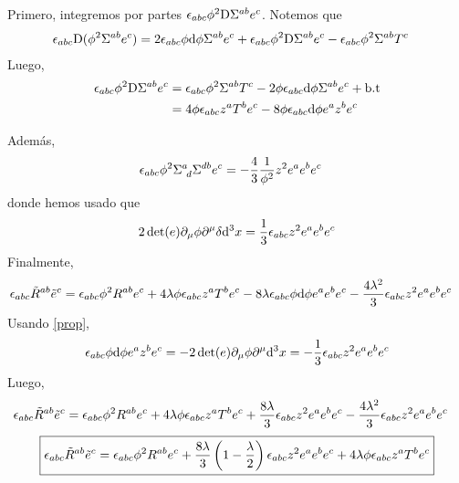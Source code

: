 Primero, integremos por partes $\epsilon_{abc}\phi^2 \mathrm{D}\Sigma^{ab}e^c$. Notemos que
\begin{align}
  \epsilon_{abc}\mathrm{D}(\phi^2\Sigma^{ab}e^c)&=2\epsilon_{abc} \phi\dd\phi\Sigma^{ab}e^c+\epsilon_{abc}\phi^2\mathrm{D}\Sigma^{ab}e^c-\epsilon_{abc}\phi^2\Sigma^{ab}T^c
\end{align}
Luego,
\begin{align}
  \epsilon_{abc}\phi^2\mathrm{D}\Sigma^{ab}e^c&=\epsilon_{abc}\phi^2\Sigma^{ab}T^c-2\phi\epsilon_{abc}\dd\phi\Sigma^{ab}e^c+\rm b.t\\
  &=4\phi\epsilon_{abc} z^{a}T^be^c-8\phi\epsilon_{abc}\dd\phi e^{a}z^be^c
\end{align}

Además,
\begin{align}
  \epsilon_{abc}\phi^2\Sigma^{a}_{~d}\Sigma^{db}e^c&=-\frac{4}{3}\frac{1}{\phi^2}z^2e^{a}e^be^c
\end{align}
donde hemos usado que
\begin{equation}\label{prop}
  2\det(e)\partial_\mu \phi\partial^\mu \delta\dd^3x=\frac{1}{3}\epsilon_{abc} z^2e^{a}e^be^c
\end{equation}
Finalmente,
\begin{align}
  \epsilon_{abc}\tilde{R}^{ab}\tilde{e}^c&=\epsilon_{abc} \phi^2R^{ab}e^c+4\lambda\phi\epsilon_{abc} z^{a}T^be^c-8\lambda\epsilon_{abc}\phi\dd\phi e^{a}e^be^c-\frac{4\lambda^2}{3}\epsilon_{abc} z^2e^{a}e^be^c
\end{align}
Usando \eqref{prop},
\begin{equation}
  \epsilon_{abc}\phi\dd\phi e^{a}z^be^c=-2\det(e)\partial_\mu \phi\partial^\mu \dd^3x=-\frac{1}{3}\epsilon_{abc} z^2e^{a}e^be^c
\end{equation}
Luego,
\begin{align}
  \epsilon_{abc}\tilde{R}^{ab}\tilde{e}^c&=\epsilon_{abc} \phi^2R^{ab}e^c+4\lambda\phi\epsilon_{abc} z^{a}T^be^c+\frac{8\lambda}{3}\epsilon_{abc} z^2e^{a}e^be^c-\frac{4\lambda^2}{3}\epsilon_{abc} z^2e^{a}e^be^c
\end{align}
\begin{equation}\label{L1}
  \boxed{\epsilon_{abc}\tilde{R}^{ab}\tilde{e}^c=\epsilon_{abc} \phi^2R^{ab}e^c +\frac{8\lambda}{3}\left(1-\frac{\lambda}{2}\right)\epsilon_{abc} z^2e^{a}e^be^c  +4\lambda\phi\epsilon_{abc} z^{a}T^be^c}
\end{equation}










